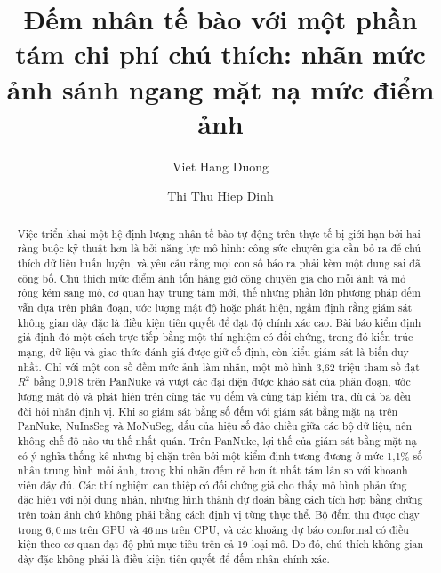 \documentclass[preprint,12pt]{elsarticle}
\begin{document}
\begin{frontmatter}

\title{Đếm nhân tế bào với một phần tám chi phí chú thích:
nhãn mức ảnh sánh ngang mặt nạ mức điểm ảnh}

\author[uit]{Viet Hang Duong}

\author[uit]{Thi Thu Hiep Dinh}


\begin{abstract}
Việc triển khai một hệ định lượng nhân tế bào tự động trên thực tế bị giới hạn bởi hai ràng buộc kỹ thuật hơn là
bởi năng lực mô hình: công sức chuyên gia cần bỏ ra để chú thích dữ liệu huấn luyện, và yêu cầu rằng mọi con số
báo ra phải kèm một dung sai đã công bố. Chú thích mức điểm ảnh tốn hàng giờ công chuyên gia cho mỗi ảnh và mở
rộng kém sang mô, cơ quan hay trung tâm mới, thế nhưng phần lớn phương pháp đếm vẫn dựa trên phân đoạn, ước lượng
mật độ hoặc phát hiện, ngầm định rằng giám sát không gian dày đặc là điều kiện tiên quyết để đạt độ chính xác cao.
Bài báo kiểm định giả định đó một cách trực tiếp bằng một thí nghiệm có đối chứng, trong đó kiến trúc mạng, dữ
liệu và giao thức đánh giá được giữ cố định, còn kiểu giám sát là biến duy nhất. Chỉ với một con số đếm mức ảnh
làm nhãn, một mô hình 3,62 triệu tham số đạt $R^2$ bằng 0,918 trên PanNuke và vượt các đại diện được khảo sát của
phân đoạn, ước lượng mật độ và phát hiện trên cùng tác vụ đếm và cùng tập kiểm tra, dù cả ba đều đòi hỏi nhãn
định vị. Khi so giám sát bằng số đếm với giám sát bằng mặt nạ trên PanNuke, NuInsSeg và MoNuSeg, dấu của hiệu số
đảo chiều giữa các bộ dữ liệu, nên không chế độ nào ưu thế nhất quán. Trên PanNuke, lợi thế của giám sát bằng mặt
nạ có ý nghĩa thống kê nhưng bị chặn trên bởi một kiểm định tương đương ở mức 1,1\% số nhân trung bình mỗi ảnh,
trong khi nhãn đếm rẻ hơn ít nhất tám lần so với khoanh viền đầy đủ. Các thí nghiệm can thiệp có đối chứng giả cho
thấy mô hình phản ứng đặc hiệu với nội dung nhân, nhưng hình thành dự đoán bằng cách tích hợp bằng chứng trên toàn
ảnh chứ không phải bằng cách định vị từng thực thể. Bộ đếm thu được chạy trong $6{,}0$\,ms trên GPU và $46$\,ms
trên CPU, và các khoảng dự báo conformal có điều kiện theo cơ quan đạt độ phủ mục tiêu trên cả 19 loại mô. Do đó,
chú thích không gian dày đặc không phải là điều kiện tiên quyết để đếm nhân chính xác.
\end{abstract}


\end{frontmatter}
\end{document}
